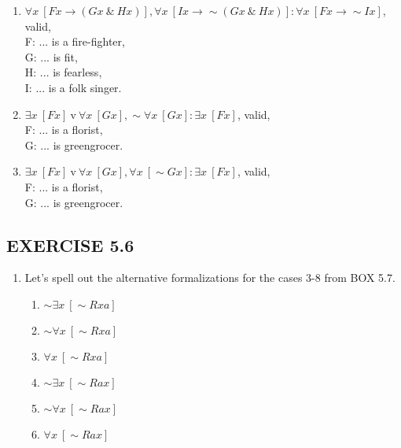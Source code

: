 \documentclass[a4paper,12pt]{article}
\newcommand{\ra}{\rightarrow}
\newcommand{\s}{\sim}
\newcommand{\tv}{ \ \textrm{v} \ }
\newcommand{\ta}{ \ \& \ }
\newcommand{\all}{\forall}
\newcommand{\ex}{\exists}
\begin{document}
\begin{enumerate}[label=\arabic*,leftmargin=*]
\begin{enumerate}[label=(\roman*),leftmargin=*]
                \item $\all x \ [Fx \ra (Gx \ta Hx)], \all x \ [Ix \ra \s (Gx \ta Hx)] : \all x \ [Fx \ra \s Ix]$, valid,\\
                    F: ... is a fire-fighter,\\
                    G: ... is fit,\\
                    H: ... is fearless,\\
                    I: ... is a folk singer.
                \item $\ex x \ [Fx] \tv \all x \ [Gx], \s \all x \ [Gx] : \ex x \ [Fx]$, valid,\\
                    F: ... is a florist,\\
                    G: ... is greengrocer.
                \item $\ex x \ [Fx] \tv \all x \ [Gx], \all x \ [\s Gx] : \ex x \ [Fx]$, valid,\\
                    F: ... is a florist,\\
                    G: ... is greengrocer.
            \end{enumerate}

    \end{enumerate}

    \subsection*{EXERCISE 5.6}

    \begin{enumerate}[label=\arabic*,leftmargin=*]
        \item Let's spell out the alternative formalizations for the cases 3-8 from BOX 5.7.
            \begin{enumerate}[label=\arabic*,start=3]
                \item $\s \ex x \ [\s Rxa]$
                \item $\s \all x \ [\s Rxa]$
                \item $\all x \ [\s Rxa]$
                \item $\s \ex x \ [\s Rax]$
                \item $\s \all x \ [\s Rax]$
                \item $\all x \ [\s Rax]$
            \end{enumerate}
    \end{enumerate}
\end{document}
